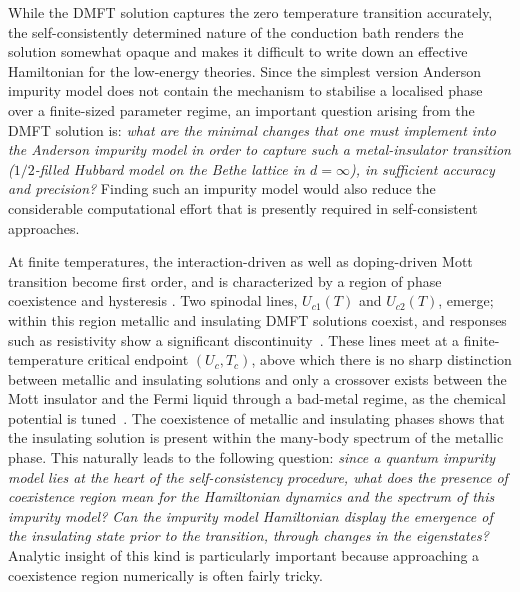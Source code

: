 While the DMFT solution captures the zero temperature transition accurately, the self-consistently determined nature of the conduction bath renders the solution somewhat opaque and makes it difficult to write down an effective Hamiltonian for the low-energy theories. Since the simplest version Anderson impurity model does not contain the mechanism to stabilise a localised phase over a finite-sized parameter regime, an important question arising from the DMFT solution is: {\it what are the minimal changes that one must implement into the Anderson impurity model in order to capture such a metal-insulator transition ($1/2$-filled Hubbard model on the Bethe lattice in \(d=\infty\)), in sufficient accuracy and precision?} Finding such an impurity model would also reduce the considerable computational effort that is presently required in self-consistent approaches.

At finite temperatures, the interaction-driven as well as doping-driven Mott transition become first order, and is characterized by a region of phase coexistence and hysteresis \cite{nozieres_dmft,rozenberg1999}. Two spinodal lines, $U_{c1}(T)$ and $U_{c2}(T)$, emerge; within this region metallic and insulating DMFT solutions coexist, and responses such as resistivity show a significant discontinuity~\cite{kotliar_2002}. These lines meet at a finite-temperature critical endpoint $(U_c,T_c)$, above which there is no sharp distinction between metallic and insulating solutions and only a crossover exists between the Mott insulator and the Fermi liquid through a bad-metal regime, as the chemical potential is tuned~\cite{rozenberg1999,kotliar1999,werner2007,deng2013,zitko2013}. The coexistence of metallic and insulating phases shows that the insulating solution is present within the many-body spectrum of the metallic phase. This naturally leads to the following question: {\it since a quantum impurity model lies at the heart of the self-consistency procedure, what does the presence of coexistence region mean for the Hamiltonian dynamics and the spectrum of this impurity model? Can the impurity model Hamiltonian display the emergence of the insulating state prior to the transition, through changes in the eigenstates?} Analytic insight of this kind is particularly important because approaching a coexistence region numerically is often fairly tricky.

